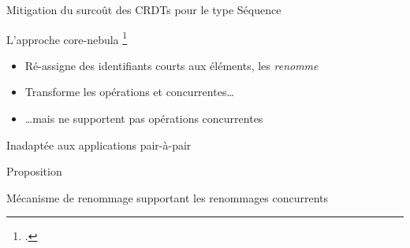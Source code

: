 \begin{frame}{Mitigation du surcoût des CRDTs pour le type Séquence}
    \begin{block}{L'approche core-nebula \footcite{zawirski:hal-01248197}}
        \begin{itemize}
            \item Ré-assigne des identifiants courts aux éléments, \ie les \emph{renomme}
            \item Transforme les opérations \ins et \rmv concurrentes\dots
            \pause
            \item \dots mais ne supportent pas opérations \ren concurrentes
        \end{itemize}
    \end{block}
    \pause
    \begin{center}
        \alert{Inadaptée aux applications pair-à-pair}
    \end{center}
\end{frame}

\begin{frame}[standout]
    \alert{Proposition}

    Mécanisme de renommage supportant les renommages concurrents
\end{frame}
